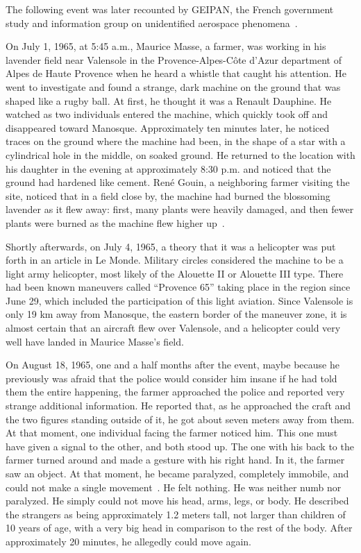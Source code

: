 \label{2023-UFO-chapter-History--1953-2016-val65}

The following event was later recounted by GEIPAN, the French government study and information group on unidentified aerospace phenomena~\cite{Valensole-GEIPAN}.

On July 1, 1965, at 5:45 a.m., Maurice Masse, a farmer, was working in his lavender field near Valensole in the Provence-Alpes-C\^ote d'Azur department of Alpes de Haute Provence when he heard a whistle that caught his attention. He went to investigate and found a strange, dark machine on the ground that was shaped like a rugby ball. At first, he thought it was a Renault Dauphine. He watched as two individuals entered the machine, which quickly took off and disappeared toward Manosque. Approximately ten minutes later, he noticed traces on the ground where the machine had been, in the shape of a star with a cylindrical hole in the middle, on soaked ground. He returned to the location with his daughter in the evening at approximately 8:30 p.m. and noticed that the ground had hardened like cement. Ren\'e Gouin, a neighboring farmer visiting the site, noticed that in a field close by, the machine had burned the blossoming lavender as it flew away: first, many plants were heavily damaged, and then fewer plants were burned as the machine flew higher up~\cite[time=23min]{ExoMagazinTV2020Aug}.

Shortly afterwards, on July 4, 1965, a theory that it was a helicopter was put forth in an article in Le Monde. Military circles considered the machine to be a light army helicopter, most likely of the Alouette II or Alouette III type. There had been known maneuvers called ``Provence 65'' taking place in the region since June 29, which included the participation of this light aviation. Since Valensole is only 19 km away from Manosque, the eastern border of the maneuver zone, it is almost certain that an aircraft flew over Valensole, and a helicopter could very well have landed in Maurice Masse's field.

On August 18, 1965, one and a half months after the event,
maybe because he previously was afraid that the police would consider him insane if he had told them the entire happening,
the farmer approached the police and reported very strange additional information.
He reported that, as he approached the craft and the two figures
standing outside of it, he got about seven meters away from them.
At that moment, one individual facing the farmer noticed him. This one must have given a signal to the other, and both stood up.
The one with his back to the farmer turned around and made a gesture with his right hand.
In it, the farmer saw an object. At that moment, he became paralyzed, completely immobile, and could not make a single movement~\cite{Niemtzow-paralysis-1975}. He felt nothing. He was neither numb nor paralyzed. He simply could not move his head, arms, legs, or body. He described the strangers as being approximately 1.2 meters tall, not larger than children of 10 years of age, with a very big head in comparison to the rest of the body. After approximately 20 minutes, he allegedly could move again.

